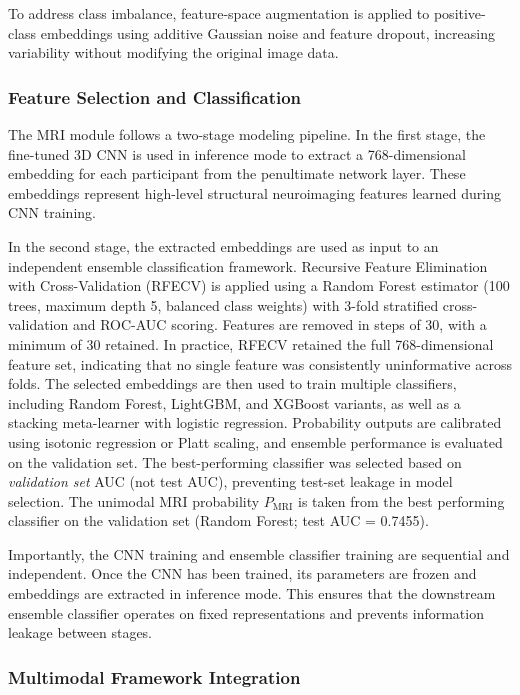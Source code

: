 \documentclass[10pt,letterpaper]{article}
\begin{document}
To address class imbalance, feature-space augmentation is applied to positive-class embeddings using additive Gaussian noise and feature dropout, increasing variability without modifying the original image data.

\subsubsection*{\textbf{Feature Selection and Classification}}

The MRI module follows a two-stage modeling pipeline. In the first stage, the fine-tuned 3D CNN is used in inference mode to extract a 768-dimensional embedding for each participant from the penultimate network layer. These embeddings represent high-level structural neuroimaging features learned during CNN training.

In the second stage, the extracted embeddings are used as input to an independent ensemble classification framework. Recursive Feature Elimination with Cross-Validation (RFECV) is applied using a Random Forest estimator (100 trees, maximum depth 5, balanced class weights) with 3-fold stratified cross-validation and ROC-AUC scoring. Features are removed in steps of 30, with a minimum of 30 retained. In practice, RFECV retained the full 768-dimensional feature set, indicating that no single feature was consistently uninformative across folds. The selected embeddings are then used to train multiple classifiers, including Random Forest, LightGBM, and XGBoost variants, as well as a stacking meta-learner with logistic regression. Probability outputs are calibrated using isotonic regression or Platt scaling, and ensemble performance is evaluated on the validation set. The best-performing classifier was selected based on \emph{validation set} AUC (not test AUC), preventing test-set leakage in model selection. The unimodal MRI probability $P_{\text{MRI}}$ is taken from the best performing classifier on the validation set (Random Forest; test AUC = 0.7455).

Importantly, the CNN training and ensemble classifier training are sequential and independent. Once the CNN has been trained, its parameters are frozen and embeddings are extracted in inference mode. This ensures that the downstream ensemble classifier operates on fixed representations and prevents information leakage between stages.

\subsubsection*{\textbf{Multimodal Framework Integration}}
\end{document}
